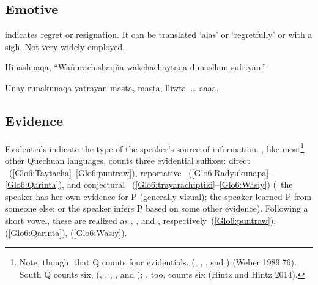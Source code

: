 \subsection{Emotive }\label{ssec:emotive}
 indicates regret or resignation. It can be translated ‘alas’ or ‘regretfully’ or with a sigh. Not very widely employed.


%
{Hinashpaqa, “Wañurachishaqña wakchachaytaqa dimasllam sufriyan.”}%
{}%
{}{}%

%
{Unay runakunaqa yatrayan masta, masta, lliwta~\dots{} aaaa.}%
{}%
{}{}%

\subsection{Evidence}\label{ssec:evidence}
Evidentials indicate the type of the speaker’s source of information. \SYQ, like most\footnote{Note, though, that  Q counts four evidentials, (, , , snd ) (Weber 1989:76). South  Q counts six, (, , , , and ); , too, counts six (Hintz and Hintz 2014).} other Quechuan languages, counts three evidential suffixes: direct ~(\ref{Glo6:Taytacha}--\ref{Glo6:puntraw}), reportative ~(\ref{Glo6:Radyukunapa}--\ref{Glo6:Qarinta}), and conjectural ~(\ref{Glo6:trayarachiptiki}--\ref{Glo6:Wasiy}) (\ie~the speaker has her own evidence for P (generally visual); the speaker learned P from someone else; or the speaker infers P based on some other evidence). Following a short vowel, these are realized as , , and , respectively~(\ref{Glo6:puntraw}), (\ref{Glo6:Qarinta}), (\ref{Glo6:Wasiy}).


